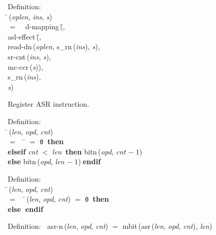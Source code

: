 \begin{tabbing}{\sc Definition}: \\  
\=\,({\it{oplen\/}}, {\it{ins\/}}, {\it{s\/}}) \\ 
$=$$\;\;\;\;${\rm{d-mapping}}\,(\=, \\ 
{\rm{asl-effect}}\,(\=, \\ 
{\rm{read-dn}}\,({\it{oplen\/}}, {\rm{s\_rn}}\,({\it{ins\/}}), {\it{s\/}}), \\ 
{\rm{sr-cnt}}\,({\it{ins\/}}, {\it{s\/}}), \\ 
{\rm{mc-ccr}}\,({\it{s\/}}))\-, \\ 
{\rm{s\_rn}}\,({\it{ins\/}}), \\ 
{\it{s\/}})\-\-
\end{tabbing}

 Register ASR instruction.
\begin{tabbing}{\sc Definition}: \\  
\=\,({\it{len\/}}, {\it{opd\/}}, {\it{cnt\/}}) \\ 
$=$$\;\;\;\;$\= $=$ {\tt{0}}$\;\;${\bf then }{} \\ 
{\bf elseif }{\it{cnt\/}} $<$ {\it{len\/}}$\;\;${\bf then }{\rm{bitn}}\,({\it{opd\/}}, {\it{cnt\/}} $-\;1$) \\ 
{\bf else }{\rm{bitn}}\,({\it{opd\/}}, {\it{len\/}} $-\;1$)$\;${\bf  endif}\-\-
\end{tabbing}

\begin{tabbing}{\sc Definition}: \\  
\=\,({\it{len\/}}, {\it{opd\/}}, {\it{cnt\/}}) \\ 
$=$$\;\;\;\;$\=\,({\it{len\/}}, {\it{opd\/}}, {\it{cnt\/}}) $=$ {\tt{0}}$\;\;${\bf then }{} \\ 
{\bf else }{}$\;${\bf  endif}\-\-
\end{tabbing}

\begin{tabbing}{\sc Definition}:$\;\;$
{\rm{asr-n}}\,({\it{len\/}}, {\it{opd\/}}, {\it{cnt\/}}) $=$ {\rm{mbit}}\,({\rm{asr}}\,({\it{len\/}}, {\it{opd\/}}, {\it{cnt\/}}), {\it{len\/}})
\end{tabbing}


